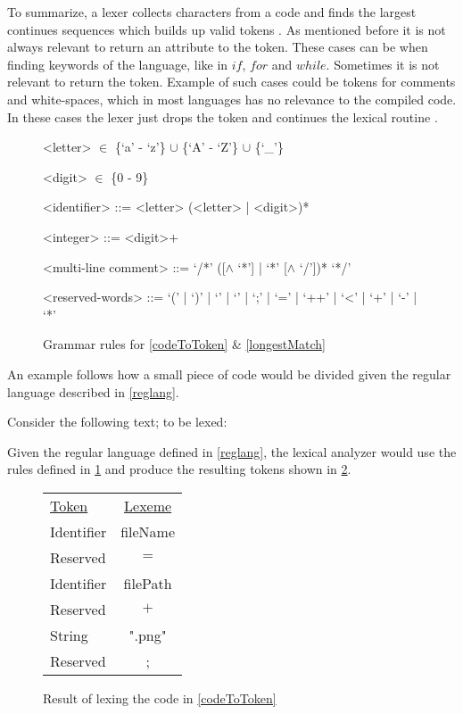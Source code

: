 To summarize, a lexer collects characters from a code and finds the largest 
continues sequences which builds up valid tokens \cite{sebesta2012}. As 
mentioned before it is not always relevant to return an attribute to the token. 
These cases can be when finding keywords of the language, like in $if$, $for$
and $while$. Sometimes it is not relevant to return the token. 
Example of such cases could be tokens for comments and white-spaces, which in 
most languages has no relevance to the compiled code. In these cases the lexer 
just drops the token and continues the lexical routine \cite{Aho2006}.

\begin{figure}[h!]
\begin{center}
\begin{grammar}

<letter>  $\in$ \{`a' - `z'\} $\cup$ \{`A' - `Z'\} $\cup$ \{`_'\}

<digit>  $\in$ \{0 - 9\}

<identifier> ::= <letter> (<letter> | <digit>)* 

<integer> ::= <digit>+

<multi-line comment> ::= `/*' ([$\wedge$ `*'] | `*' [$\wedge$ `/'])* `*/'

<reserved-words> ::= `(' | `)' | `{' | `}' | `;' | `=' | `++' | `<' | `+' | `-' | `*'

\end{grammar}
\caption{Grammar rules for \cref{codeToToken} \& \cref{longestMatch}\label{fig:grammar}}
\end{center}
\end{figure}

An example follows how a small piece of code would be divided given the regular
language described in \cref{reglang}.

\newpage

\begin{example} \label{codeToToken}$ $\\
Consider the following text; to be lexed:

Given the regular language defined in \cref{reglang}, the lexical analyzer would
use the rules defined in \cref{fig:grammar} and produce the resulting
tokens shown in \cref{fig:codeToToken}.

\begin{figure}[h!]
\begin{center}
\begin{tabular}{l c}
\underline{Token} & \underline{Lexeme}\\
Identifier & fileName\\
Reserved & $=$\\
Identifier & filePath\\
Reserved & $+$\\
String & ".png"\\
Reserved & ;
\end{tabular}
\end{center}
\caption{Result of lexing the code in \cref{codeToToken} \label{fig:codeToToken}}
\end{figure}
\end{example}

